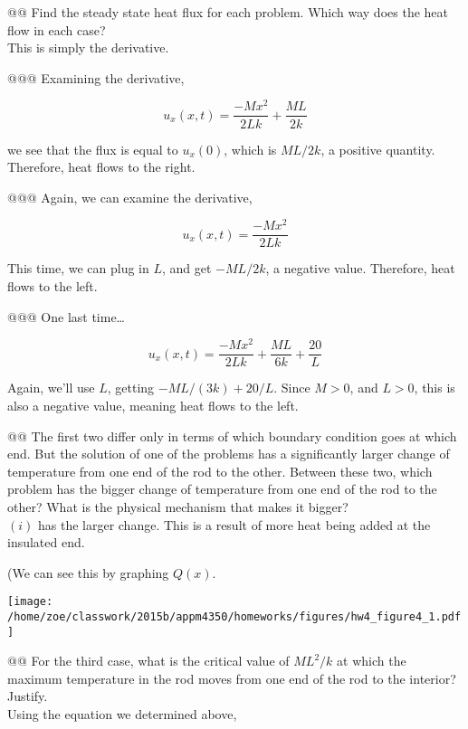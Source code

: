 \documentclass[10pt]{article}
\begin{document}
\begin{easylist}[enumerate]
\noweave

    @@ Find the steady state heat flux for each problem. Which way does the heat flow in each case?\\

    This is simply the derivative.

    @@@ Examining the derivative,

    \[
        u_x(x, t) = \frac{-Mx^2}{2Lk} + \frac{ML}{2k}
    \]

    we see that the flux is equal to $u_x(0)$, which is $ML / 2k$, a positive quantity. Therefore, heat flows to the
    right.

    @@@ Again, we can examine the derivative,

    \[
        u_x(x, t) = \frac{-Mx^2}{2Lk}
    \]

    This time, we can plug in $L$, and get $-ML / 2k$, a negative value. Therefore, heat flows to the left.

    @@@ One last time\ldots

    \[
        u_x(x, t) = \frac{-Mx^2}{2Lk} + \frac{ML}{6k} + \frac{20}{L}
    \]

    Again, we'll use $L$, getting $-ML / (3k) + 20 / L$. Since $M > 0$, and $L > 0$, this is also a negative value,
    meaning heat flows to the left.

    @@ The first two differ only in terms of which boundary condition goes at which end. But the solution of one of the
    problems has a significantly larger change of temperature from one end of the rod to the other. Between these two,
    which problem has the bigger change of temperature from one end of the rod to the other? What is the physical
    mechanism that makes it bigger?\\

    $(i)$ has the larger change. This is a result of more heat being added at the insulated end.

    (We can see this by graphing $Q(x)$.

\simpleweave

\texttt{[image: /home/zoe/classwork/2015b/appm4350/homeworks/figures/hw4\_figure4\_1.pdf]}

\nosimpleweave

    @@ For the third case, what is the critical value of $ML^2/k$ at which the maximum temperature in the rod moves from
    one end of the rod to the interior? Justify.\\

    Using the equation we determined above,


\end{easylist}
\end{document}
